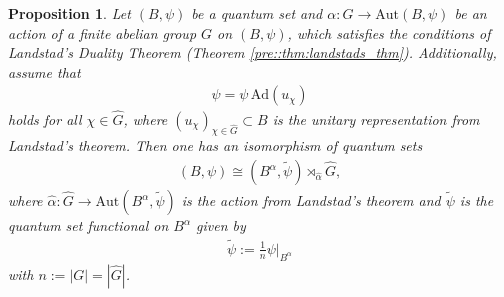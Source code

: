 \documentclass{amsart}
\newtheorem{proposition}[thm]{Proposition}
\theoremstyle{definition}
\theoremstyle{definition}
\begin{document}
\begin{proposition}
    \label{pre::prop:landstad_for_quantum_sets}
    Let $(B, \psi)$ be a quantum set and $\alpha: G \to \mathrm{Aut}(B, \psi)$ be an action of a finite abelian group $G$ on $(B, \psi)$, which satisfies the conditions of Landstad's Duality Theorem (Theorem \ref{pre::thm:landstads_thm}). Additionally, assume that
    \begin{align}
        \label{land::eq:psi_invariant_under_adjoint_action}
        \psi = \psi \, \mathrm{Ad}(u_\chi)
    \end{align}
    holds for all $\chi \in \hat{G}$, where $(u_\chi)_{\chi \in \hat{G}} \subset B$ is the unitary representation from Landstad's theorem.
    Then one has an isomorphism of quantum sets
    \begin{align*}
        (B, \psi) \cong (B^\alpha, \tilde{\psi}) \rtimes_{\hat{\alpha}} \hat{G},
    \end{align*}
    where $\hat{\alpha}: \hat{G} \to \mathrm{Aut}(B^\alpha, \tilde{\psi})$ is the action from Landstad's theorem and $\tilde{\psi}$ is the quantum set functional on $B^\alpha$ given by
    \begin{align*}
        \tilde{\psi} := \frac{1}{n} \psi|_{B^\alpha}
    \end{align*}
    with $n := |G| = |\hat{G}|$.
\end{proposition}
\end{document}
